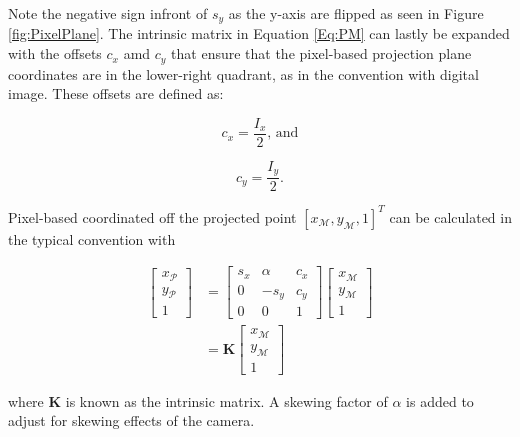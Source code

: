 \noindent 
Note the negative sign infront of $s_y$ as the y-axis are flipped as seen in Figure \ref{fig:PixelPlane}. The intrinsic matrix in 
Equation \ref{Eq:PM} can lastly be expanded with the offsets $c_x$ amd $c_y$ that ensure that the pixel-based projection plane coordinates are in the lower-right 
quadrant, as in the convention with digital image. These offsets are defined as:

\begin{equation}
    c_x = \frac{I_x}{2} \text{, and}
\end{equation}

\begin{equation}
    c_y = \frac{I_y}{2} \text{.}
\end{equation}

\noindent
Pixel-based coordinated off the projected point $[x_\mathcal{M}, y_\mathcal{M},1]^T$ can be calculated in the typical convention with

\begin{equation}
\begin{split}
    \begin{bmatrix}
        x_\mathcal{P} \\
        y_\mathcal{P} \\
        1
    \end{bmatrix}
    &=
    \begin{bmatrix}
        s_x & \alpha & c_x \\
        0 & -s_y    & c_y \\
        0 & 0 & 1
    \end{bmatrix}
    \begin{bmatrix}
        x_\mathcal{M} \\
        y_\mathcal{M} \\
        1
    \end{bmatrix} \\[6pt]
    &=
    \mathbf{K}
    \begin{bmatrix}
        x_\mathcal{M} \\
        y_\mathcal{M} \\
        1
    \end{bmatrix}
\end{split}
\end{equation}

\noindent
where $\mathbf{K}$ is known as the intrinsic matrix. A skewing factor of $\alpha$ is added to adjust for skewing effects of the camera.
\vspace{0.5cm}

